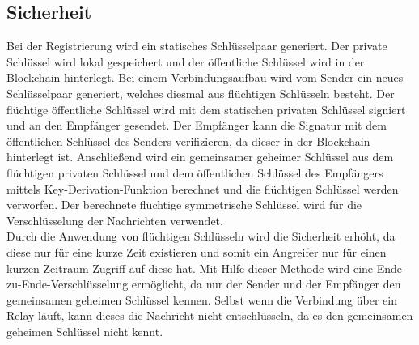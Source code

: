 \subsection{Sicherheit}


Bei der Registrierung wird ein statisches Schlüsselpaar generiert. Der private Schlüssel wird lokal gespeichert und der öffentliche Schlüssel wird in der Blockchain hinterlegt. Bei einem Verbindungsaufbau wird vom Sender ein neues Schlüsselpaar generiert, welches diesmal aus flüchtigen Schlüsseln besteht. Der flüchtige öffentliche Schlüssel wird mit dem statischen privaten Schlüssel signiert und an den Empfänger gesendet. Der Empfänger kann die Signatur mit dem öffentlichen Schlüssel des Senders verifizieren, da dieser in der Blockchain hinterlegt ist. Anschließend wird ein gemeinsamer geheimer Schlüssel aus dem flüchtigen privaten Schlüssel und dem öffentlichen Schlüssel des Empfängers mittels Key-Derivation-Funktion berechnet und die flüchtigen Schlüssel werden verworfen. Der berechnete flüchtige symmetrische Schlüssel wird für die Verschlüsselung der Nachrichten verwendet. \\
Durch die Anwendung von flüchtigen Schlüsseln wird die Sicherheit erhöht, da diese nur für eine kurze Zeit existieren und somit ein Angreifer nur für einen kurzen Zeitraum Zugriff auf diese hat.
Mit Hilfe dieser Methode wird eine Ende-zu-Ende-Verschlüsselung ermöglicht, da nur der Sender und der Empfänger den gemeinsamen geheimen Schlüssel kennen. Selbst wenn die Verbindung über ein Relay läuft, kann dieses die Nachricht nicht entschlüsseln, da es den gemeinsamen geheimen Schlüssel nicht kennt.

